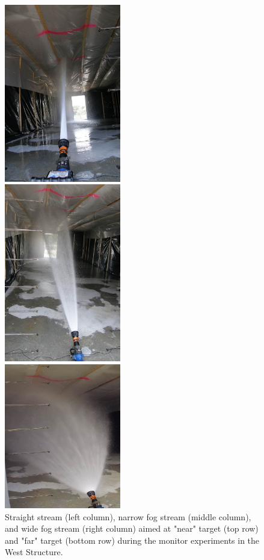\documentclass[12pt,oneside]{book}
\begin{document}
\begin{figure}[!ht]
\begin{center}
\end{center}
\endminipage \hfill
\vspace{0.15in}
\minipage{2.15in}
\begin{center}
	\includegraphics[width=2in]{../Pictures/SS_far}
\end{center} 
\endminipage \hfill
\minipage{2.15in}
\begin{center}
	\includegraphics[width=2in]{../Pictures/NF_far}
\end{center}
\endminipage \hfill
\minipage{2.15in}
\begin{center}
	\includegraphics[width=2in]{../Pictures/WF_far}
\end{center}
\endminipage \hfill
\caption[Straight stream, narrow fog stream, and wide fog stream aimed at the near and far targets in the West Structure.]{Straight stream (left column), narrow fog stream (middle column), and wide fog stream (right column) aimed at "near" target (top row) and "far" target (bottom row) during the monitor experiments in the West Structure.}
\label{fig:test_16_17_pic}
\end{figure}
\FloatBarrier
\end{document}
